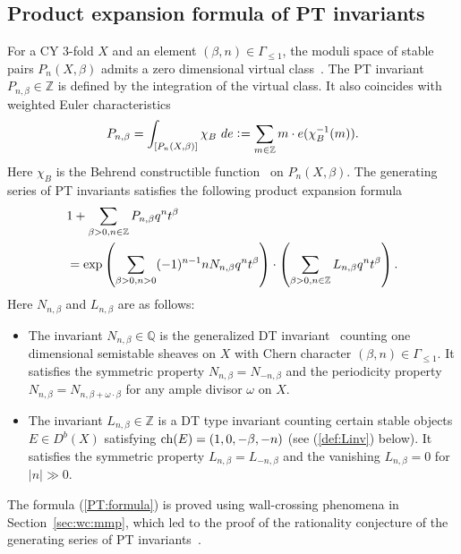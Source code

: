\documentclass[11pt]{amsart}
\theoremstyle{plain}
\theoremstyle{definition}
\theoremstyle{remark}
\newcommand{\ch}{\mathop{\rm ch}\nolimits}
\begin{document}
\subsection{Product expansion formula of PT invariants}
For a CY 3-fold $X$ and an element 
$(\beta, n) \in \Gamma_{\le 1}$, 
the moduli space of stable pairs 
$P_n(X, \beta)$
admits a zero dimensional virtual class~\cite{PT}. 
The PT invariant $P_{n, \beta}\in \mathbb{Z}$
is defined by the integration of the virtual class. 
It also coincides with weighted 
Euler characteristics 
\begin{align*}
P_{n, \beta} = \int_{[P_n(X, \beta)]} \chi_B \ de
\cneq \sum_{m\in \mathbb{Z}} m \cdot e(\chi_B^{-1}(m)). 
\end{align*}
Here $\chi_B$ is the Behrend constructible function~\cite{Beh}
 on $P_n(X, \beta)$.  
The generating series of PT invariants 
satisfies the following product expansion formula
\begin{align}\label{PT:formula}
&1+\sum_{\beta>0, n \in \mathbb{Z}}P_{n, \beta}q^n t^{\beta} \\
\notag
&=\exp \left( \sum_{\beta>0, n>0} (-1)^{n-1} n N_{n, \beta} q^n t^{\beta}
  \right) \cdot \left( \sum_{\beta>0, n \in \mathbb{Z}} 
L_{n, \beta}q^n t^{\beta} \right).
\end{align}
Here 
$N_{n, \beta}$ and $L_{n, \beta}$ are as follows: 
\begin{itemize}
\item The invariant
$N_{n, \beta} \in \mathbb{Q}$ is the 
generalized DT invariant~\cite{JS}
counting one dimensional semistable sheaves on $X$
with 
Chern character $(\beta, n) \in \Gamma_{\le 1}$.
It satisfies the symmetric property
$N_{n, \beta}=N_{-n, \beta}$ and the 
periodicity property $N_{n, \beta}=N_{n, \beta+\omega \cdot \beta}$
for any ample divisor $\omega$ on $X$. 

\item
The invariant  $L_{n, \beta} \in \mathbb{Z}$ 
is a DT type invariant counting certain 
stable objects $E \in D^b(X)$
satisfying $\ch(E)=(1, 0, -\beta, -n)$ 
(see (\ref{def:Linv}) below). 
It satisfies the symmetric property 
$L_{n, \beta}=L_{-n, \beta}$ and the vanishing 
$L_{n, \beta}=0$ for $\lvert n \rvert \gg 0$. 
\end{itemize}

The formula (\ref{PT:formula})
is proved 
using 
wall-crossing phenomena in Section~\ref{sec:wc:mmp}, 
which 
led to the proof of the rationality conjecture of 
the generating series of PT invariants~\cite{MNOP, PT}. 
\end{document}
